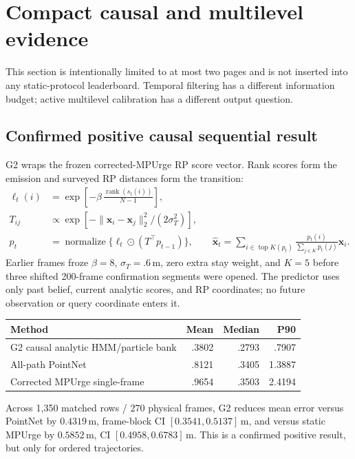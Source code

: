 \documentclass[10pt]{article}
\newcommand{\m}{\,\mathrm m}
\begin{document}
\clearpage
\section{Compact causal and multilevel evidence}

This section is intentionally limited to at most two pages and is not inserted
into any static-protocol leaderboard.  Temporal filtering has a different
information budget; active multilevel calibration has a different output
question.

\subsection{Confirmed positive causal sequential result}

G2 wraps the frozen corrected-MPUrge RP score vector.  Rank scores form the
emission and surveyed RP distances form the transition:
\begin{align}
 \ell_t(i)&=\exp\!\left[-\beta\,
 \frac{\operatorname{rank}(s_t(i))}{N-1}\right],\\
 T_{ij}&\propto\exp[-\|\mathbf x_i-\mathbf x_j\|_2^2/(2\sigma_T^2)],\\
 p_t&=\operatorname{normalize}\{\ell_t\odot(T^\top p_{t-1})\},\qquad
 \widehat{\mathbf x}_t=\sum_{i\in\operatorname{top}K(p_t)}
 \frac{p_t(i)}{\sum_{j\in K}p_t(j)}\mathbf x_i.
\end{align}
Earlier frames froze $\beta=8$, $\sigma_T=.6\m$, zero extra stay weight, and
$K=5$ before three shifted 200-frame confirmation segments were opened.  The
predictor uses only past belief, current analytic scores, and RP coordinates;
no future observation or query coordinate enters it.

\begin{table}[ht]
\centering\small
\begin{tabular}{@{}lrrr@{}}
\toprule Method & Mean & Median & P90\\\midrule
G2 causal analytic HMM/particle bank & .3802 & .2793 & .7907\\
All-path PointNet & .8121 & .3405 & 1.3887\\
Corrected MPUrge single-frame & .9654 & .3503 & 2.4194\\
\bottomrule
\end{tabular}
\end{table}

Across 1,350 matched rows / 270 physical frames, G2 reduces mean error versus
PointNet by $0.4319\m$, frame-block CI $[0.3541,0.5137]\m$, and versus static
MPUrge by $0.5852\m$, CI $[0.4958,0.6783]\m$.  This is a confirmed positive
result, but only for ordered trajectories.
\end{document}
